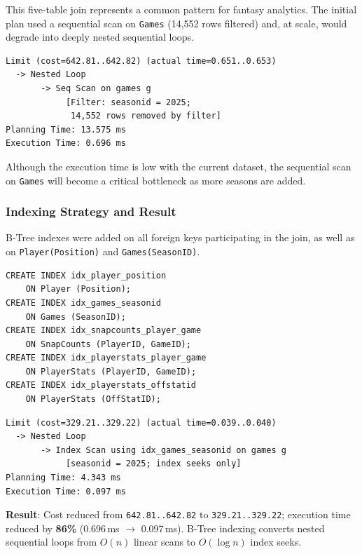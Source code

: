 \documentclass[conference]{IEEEtran}
\begin{document}
This five-table join represents a common pattern for fantasy analytics. The initial plan used a sequential scan on \texttt{Games} (14{,}552 rows filtered) and, at scale, would degrade into deeply nested sequential loops.

\begin{lstlisting}[style=planstyle, caption={Initial plan -- Query 3 (before index)}]
Limit (cost=642.81..642.82) (actual time=0.651..0.653)
  -> Nested Loop
       -> Seq Scan on games g
            [Filter: seasonid = 2025;
             14,552 rows removed by filter]
Planning Time: 13.575 ms
Execution Time: 0.696 ms
\end{lstlisting}

Although the execution time is low with the current dataset, the sequential scan on \texttt{Games} will become a critical bottleneck as more seasons are added.

\subsubsection{Indexing Strategy and Result}

B-Tree indexes were added on all foreign keys participating in the join, as well as on \texttt{Player(Position)} and \texttt{Games(SeasonID)}.

\begin{lstlisting}[style=sqlstyle, caption={Index creation -- Query 3}]
CREATE INDEX idx_player_position
    ON Player (Position);
CREATE INDEX idx_games_seasonid
    ON Games (SeasonID);
CREATE INDEX idx_snapcounts_player_game
    ON SnapCounts (PlayerID, GameID);
CREATE INDEX idx_playerstats_player_game
    ON PlayerStats (PlayerID, GameID);
CREATE INDEX idx_playerstats_offstatid
    ON PlayerStats (OffStatID);
\end{lstlisting}

\begin{lstlisting}[style=planstyle, caption={Optimized plan -- Query 3 (after index)}]
Limit (cost=329.21..329.22) (actual time=0.039..0.040)
  -> Nested Loop
       -> Index Scan using idx_games_seasonid on games g
            [seasonid = 2025; index seeks only]
Planning Time: 4.343 ms
Execution Time: 0.097 ms
\end{lstlisting}

\textbf{Result}: Cost reduced from \texttt{642.81..642.82} to \texttt{329.21..329.22}; execution time reduced by \textbf{86\%} (0.696\,ms $\rightarrow$ 0.097\,ms). B-Tree indexing converts nested sequential loops from $O(n)$ linear scans to $O(\log n)$ index seeks.
\end{document}
